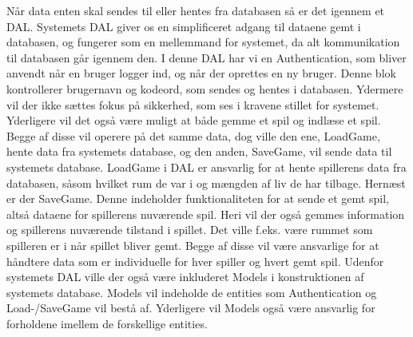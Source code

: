 Når data enten skal sendes til eller hentes fra databasen så er det igennem et DAL. Systemets DAL giver os en simplificeret adgang til dataene gemt i databasen, og fungerer som en mellemmand for systemet, da alt kommunikation til databasen går igennem den.
I denne DAL har vi en Authentication, som bliver anvendt når en bruger logger ind, og når der oprettes en ny bruger. Denne blok kontrollerer brugernavn og kodeord, som sendes og hentes i databasen. Ydermere vil der ikke sættes fokus på sikkerhed, som ses i kravene stillet for systemet.
Yderligere vil det også være muligt at både gemme et spil og indlæse et spil. Begge af disse vil operere på det samme data, dog ville den ene, LoadGame, hente data fra systemets database, og den anden, SaveGame, vil sende data til systemets database. 
LoadGame i DAL er ansvarlig for at hente spillerens data fra databasen, såsom hvilket rum de var i og mængden af liv de har tilbage. 
Hernæst er der SaveGame. Denne indeholder funktionaliteten for at sende et gemt spil, altså dataene for spillerens nuværende spil. Heri vil der også gemmes information og spillerens nuværende tilstand i spillet. Det ville f.eks. være rummet som spilleren er i når spillet bliver gemt.
Begge af disse vil være ansvarlige for at håndtere data som er individuelle for hver spiller og hvert gemt spil.
Udenfor systemets DAL ville der også være inkluderet Models i konstruktionen af systemets database. Models vil indeholde de entities som Authentication og Load-/SaveGame vil bestå af. Yderligere vil Models også være ansvarlig for forholdene imellem de forskellige entities. 
